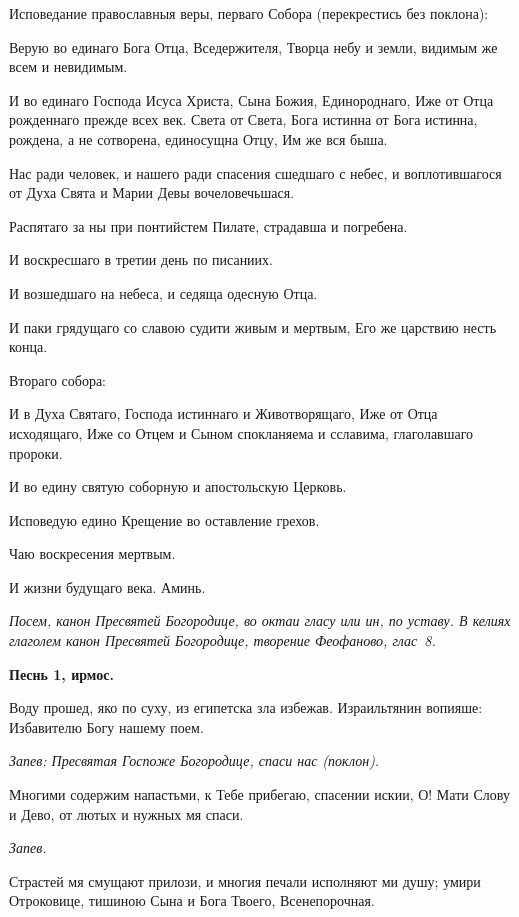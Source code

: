 Исповедание православныя веры, перваго Собора (перекрестись без поклона): 

Верую во единаго Бога Отца, Вседержителя, Творца небу и земли, видимым же всем и невидимым.

И во единаго Господа Исуса Христа, Сына  Божия, Единороднаго, Иже от Отца рожденнаго прежде всех век. Света от Света, Бога истинна от Бога истинна, рождена, а не сотворена, единосущна Отцу, Им же вся быша.

Нас ради человек, и нашего ради спасения сшедшаго с небес, и воплотившагося от Духа Свята и Марии Девы вочеловечьшася.

Распятаго за ны при понтийстем Пилате, страдавша и погребена.

И воскресшаго в третии день по писаниих.

И возшедшаго на небеса, и седяща одесную Отца.

И паки грядущаго со славою судити живым и мертвым, Его же царствию несть конца.

Втораго собора:

И в Духа Святаго, Господа истиннаго и Животворящаго, Иже от Отца исходящаго, Иже со Отцем и Сыном спокланяема  и сславима, глаголавшаго пророки.

И во едину святую соборную и апостольскую Церковь.

Исповедую едино Крещение во оставление грехов.

Чаю воскресения мертвым.

И жизни будущаго века. Аминь.


\itshape Посем, канон Пресвятей Богородице, во октаи гласу или ин, по уставу. В  келиях глаголем канон Пресвятей Богородице, творение Феофаново, глас 8. \normalfont{}


\medskip


\bfseries Песнь 1, ирмос.\normalfont{}


Воду прошед, яко по суху, из египетска зла избежав. Израильтянин вопияше: Избавителю Богу нашему поем.


\itshape Запев:\normalfont{} Пресвятая Госпоже Богородице, спаси нас (поклон).

Многими содержим напастьми, к Тебе прибегаю, спасении искии, О! Мати Слову и Дево, от лютых и нужных мя спаси.


\itshape Запев.\normalfont{}


Страстей мя смущают прилози, и многия печали исполняют ми душу; умири Отроковице, тишиною Сына и Бога Твоего, Всенепорочная.



